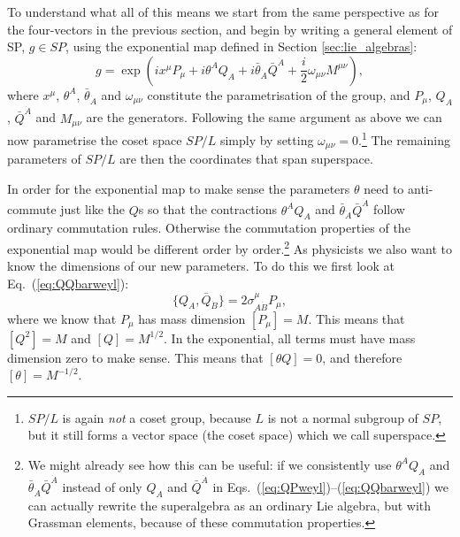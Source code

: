\documentclass[notes.tex]{subfiles}
\begin{document}
To understand what all of this means we start from the same perspective as for the four-vectors in the previous section, and begin by writing a general element of SP, $g\in SP$, using the exponential map defined in Section \ref{sec:lie_algebras}:
\[g = \exp\left(ix^\mu P_\mu + i\theta^{A} Q_A + i\bar{\theta}_{\dot{A}}\bar{Q}^{\dot{A}} + \frac{i}{2}\omega_{\mu\nu}M^{\mu\nu}\right),\]
where $x^\mu$, $\theta^{A}$, $\bar{\theta}_{\dot{A}}$ and $\omega_{\mu\nu}$ constitute the parametrisation of the group, and $P_\mu$, $Q_A$, $\bar Q^{\dot{A}}$ and $M_{\mu\nu}$ are the generators. Following the same argument as above we can now parametrise the coset space $SP/L$ simply by setting $\omega_{\mu\nu} = 0$.\footnote{$SP/L$ is again {\it not} a coset group, because $L$ is not a normal subgroup of $SP$, but it still forms a vector space (the coset space) which we call superspace.} The remaining parameters of $SP/L$ are then the coordinates that span superspace. 

In order for the exponential map to make sense the parameters $\theta$ need to anti-commute just like the $Q$s so that the contractions $\theta^{A} Q_A$ and $\bar{\theta}_{\dot{A}}\bar{Q}^{\dot{A}}$ follow ordinary commutation rules. Otherwise the commutation properties of the exponential map would be different order by order.\footnote{We might already see how this can be useful: if we consistently use $\theta^AQ_A$ and $\bar{\theta}_{\dot{A}}\bar{Q}^{\dot{A}}$ instead of only $Q_A$ and $\bar{Q}^{\dot{A}}$ in Eqs.~(\ref{eq:QPweyl})--(\ref{eq:QQbarweyl}) we can actually rewrite the superalgebra as an ordinary Lie algebra, but with Grassman elements, because of these commutation properties.}
 As physicists we also want to know the dimensions of our new parameters. To do this we first look at Eq.~(\ref{eq:QQbarweyl}):
\[\{Q_A, \bar{Q}_{\dot{B}}\} = 2\sigma^{\mu}_{A\dot{B}}P_\mu,\]
where we know that $P_\mu$ has mass dimension $[P_\mu] = M$. This means that $[Q^2] = M$ and $[Q]=M^{1/2}$. In the exponential, all terms must have mass dimension zero to make sense. This means that $[\theta Q] = 0$, and therefore $[\theta] = M^{-1/2}$.
\end{document}
